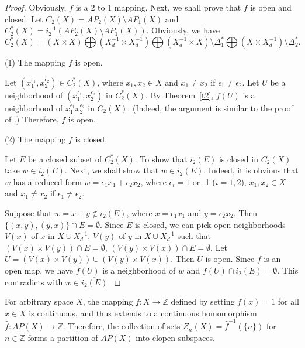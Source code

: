 \documentclass{amsart}
\theoremstyle{definition}
\begin{document}
\begin{proof}
Obviously, $f$ is a 2 to 1 mapping. Next, we shall prove that $f$ is open and closed. Let $C_{2}(X)=AP_{2}(X)\setminus AP_{1}(X)$ and $C_{2}^{\ast}(X)=i_{2}^{-1}(AP_{2}(X)\setminus AP_{1}(X))$. Obviously, we have $$C_{2}^{\ast}(X)=(X\times X)\bigoplus (X_{d}^{-1}\times X_{d}^{-1})\bigoplus (X_{d}^{-1}\times X)\setminus\Delta_{1}^{\ast}\bigoplus (X\times X_{d}^{-1})\setminus\Delta_{2}^{\ast}.$$

(1) The mapping $f$ is open.

Let $(x_{1}^{\epsilon_{1}}, x_{2}^{\epsilon_{2}})\in C_{2}^{\ast}(X)$, where $x_{1}, x_{2}\in X$ and $x_{1}\neq x_{2}$ if $\epsilon_{1}\neq\epsilon_{2}$. Let $U$ be a neighborhood of $(x_{1}^{\epsilon_{1}}, x_{2}^{\epsilon_{2}})$ in $C_{2}^{\ast}(X)$. By Theorem~\ref{t2}, $f(U)$ is a neighborhood of $x_{1}^{\epsilon_{1}} x_{2}^{\epsilon_{2}}$ in $C_{2}(X)$. (Indeed, the argument is similar to the proof of \cite[Theorem 3.4]{EN2013}.) Therefore, $f$ is open.

(2) The mapping $f$ is closed.

Let $E$ be a closed subset of $C_{2}^{\ast}(X)$. To show that $i_{2}(E)$ is closed in $C_{2}(X)$ take $w\in \overline{i_{2}(E)}$. Next, we shall show that $w\in i_{2}(E)$. Indeed, it is obvious that $w$ has a reduced form $w=\epsilon_{1}x_{1}+\epsilon_{2}x_{2}$, where $\epsilon_{i}=1$ or -1 ($i=1, 2$), $x_{1}, x_{2}\in X$ and $x_{1}\neq x_{2}$ if $\epsilon_{1}\neq\epsilon_{2}$.

Suppose that $w=x+y\notin i_2(E)$, where $x=\epsilon_{1}x_{1}$ and $y=\epsilon_{2}x_{2}$. Then $\{(x, y), (y, x)\}\cap E=\emptyset$. Since $E$ is closed, we can pick open neighborhoods $V(x)$ of $x$ in $X\cup X_{d}^{-1}$, $V(y)$ of $y$ in $X\cup X_{d}^{-1}$ such that $(V(x)\times V(y))\cap E=\emptyset$, $(V(y)\times V(x))\cap E=\emptyset$.  Let $U=(V(x)\times V(y))\cup (V(y)\times V(x))$. Then $U$ is open. Since $f$ is an open map, we have $f(U)$ is a neighborhood of $w$ and $f(U)\cap i_2(E)=\emptyset$. This contradicts with $w\in \overline{i_2(E)}$.

\end{proof}

For arbitrary space $X$, the mapping $f: X\longrightarrow \mathbb{Z}$ defined by setting $f(x)=1$ for all $x\in X$ is continuous, and thus extends to a continuous homomorphism $\widehat{f}: AP(X)\longrightarrow \mathbb{Z}$. Therefore, the collection of sets $Z_{n}(X)=\widehat{f}^{-1}(\{n\})$ for $n\in \mathbb{Z}$ forms a partition of $AP(X)$ into clopen subspaces.
\end{document}
